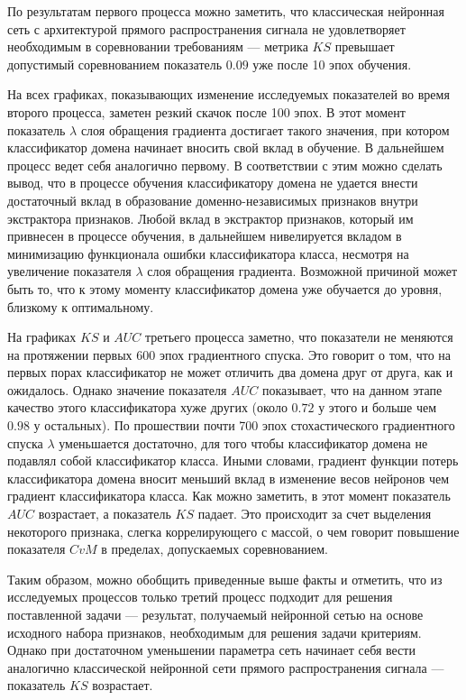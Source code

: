\documentclass[14pt, a4paper]{extarticle}
\begin{document}
По результатам первого процесса можно заметить, что классическая нейронная сеть с архитектурой прямого распространения сигнала не удовлетворяет необходимым в соревновании требованиям — метрика $KS$ превышает допустимый соревнованием показатель $0.09$ уже после 10 эпох обучения. 

На всех графиках, показывающих изменение исследуемых показателей во время второго процесса, заметен резкий скачок после 100 эпох. В этот момент показатель $\lambda$  слоя обращения градиента достигает такого значения, при котором классификатор домена начинает вносить свой вклад в обучение. В дальнейшем процесс ведет себя аналогично первому. В соответствии с этим можно сделать вывод, что в процессе обучения классификатору домена не удается внести достаточный вклад в образование доменно-независимых признаков внутри экстрактора признаков. Любой вклад в экстрактор признаков, который им привнесен в процессе обучения, в дальнейшем нивелируется вкладом в минимизацию функционала ошибки классификатора класса, несмотря на увеличение показателя $\lambda$ слоя обращения градиента. Возможной причиной может быть то, что к этому моменту классификатор домена уже обучается до уровня, близкому к оптимальному.  

На графиках $KS$ и $AUC$ третьего процесса заметно, что показатели не меняются на протяжении первых 600 эпох градиентного спуска. Это говорит о том, что на первых порах классификатор не может отличить два домена друг от друга, как и ожидалось. Однако значение показателя $AUC$ показывает, что на данном этапе качество этого классификатора хуже других (около $0.72$ у этого и больше чем $0.98$ у остальных). По прошествии почти 700 эпох стохастического градиентного спуска $\lambda$ уменьшается достаточно, для того чтобы классификатор домена не подавлял собой классификатор класса. Иными словами, градиент функции потерь классификатора домена вносит меньший вклад в изменение весов нейронов чем градиент классификатора класса. Как можно заметить, в этот момент показатель $AUC$ возрастает, а показатель $KS$ падает. Это происходит за счет выделения некоторого признака, слегка коррелирующего с массой, о чем говорит повышение показателя $CvM$ в пределах, допускаемых соревнованием.

Таким образом, можно обобщить приведенные выше факты и отметить, что из исследуемых процессов только третий процесс подходит для решения поставленной задачи — результат, получаемый нейронной сетью на основе исходного набора признаков, необходимым для решения задачи критериям. Однако при достаточном уменьшении параметра сеть начинает себя вести аналогично классической нейронной сети прямого распространения сигнала — показатель $KS$ возрастает.
\end{document}
